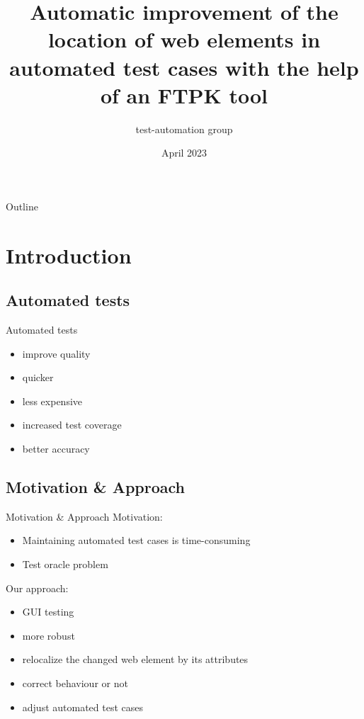 \documentclass{beamer}
\title{Automatic improvement of the location of web elements in automated test cases with the help of an FTPK tool}
\subtitle{}
\author{test-automation group}
\institute{ELTE}
\date{April 2023}
\begin{document}
\begin{frame}
\titlepage
\end{frame}

\begin{frame}{Outline}
\tableofcontents
\end{frame}

\section{Introduction}

\subsection{Automated tests}
\begin{frame}{Automated tests}
\begin{itemize}
    \item improve quality
    \item quicker
    \item less expensive
    \item increased test coverage
    \item better accuracy
\end{itemize}
\end{frame}

\subsection{Motivation \& Approach}
\begin{frame}{Motivation \& Approach}
Motivation: 
\begin{itemize}
    \item Maintaining automated test cases is time-consuming
    \item Test oracle problem
\end{itemize}

\vspace{5mm} %

Our approach:
\begin{itemize}
    \item GUI testing
    \item more robust
    \item relocalize the changed web element by its attributes
    \item correct behaviour or not
    \item adjust automated test cases
\end{itemize}
\end{frame}
\end{document}
